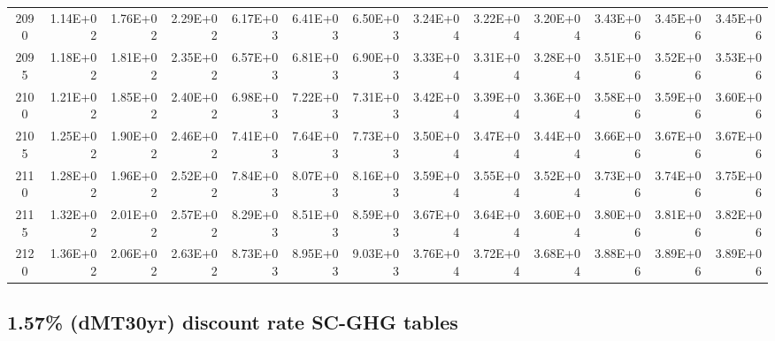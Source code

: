 \documentclass{article}
\begin{document}
\begin{table}
\begin{tabular}{crrr|rrr|rrr|rrr}
2090     & 1.14E+02 & 1.76E+02 & 2.29E+02 & 6.17E+03 & 6.41E+03 & 6.50E+03 & 3.24E+04 & 3.22E+04 & 3.20E+04 & 3.43E+06 & 3.45E+06 & 3.45E+06 \\
2095     & 1.18E+02 & 1.81E+02 & 2.35E+02 & 6.57E+03 & 6.81E+03 & 6.90E+03 & 3.33E+04 & 3.31E+04 & 3.28E+04 & 3.51E+06 & 3.52E+06 & 3.53E+06 \\
2100     & 1.21E+02 & 1.85E+02 & 2.40E+02 & 6.98E+03 & 7.22E+03 & 7.31E+03 & 3.42E+04 & 3.39E+04 & 3.36E+04 & 3.58E+06 & 3.59E+06 & 3.60E+06 \\
2105     & 1.25E+02 & 1.90E+02 & 2.46E+02 & 7.41E+03 & 7.64E+03 & 7.73E+03 & 3.50E+04 & 3.47E+04 & 3.44E+04 & 3.66E+06 & 3.67E+06 & 3.67E+06 \\
2110     & 1.28E+02 & 1.96E+02 & 2.52E+02 & 7.84E+03 & 8.07E+03 & 8.16E+03 & 3.59E+04 & 3.55E+04 & 3.52E+04 & 3.73E+06 & 3.74E+06 & 3.75E+06 \\
2115     & 1.32E+02 & 2.01E+02 & 2.57E+02 & 8.29E+03 & 8.51E+03 & 8.59E+03 & 3.67E+04 & 3.64E+04 & 3.60E+04 & 3.80E+06 & 3.81E+06 & 3.82E+06 \\
2120     & 1.36E+02 & 2.06E+02 & 2.63E+02 & 8.73E+03 & 8.95E+03 & 9.03E+03 & 3.76E+04 & 3.72E+04 & 3.68E+04 & 3.88E+06 & 3.89E+06 & 3.89E+06
\end{tabular}   \end{table}
\clearpage

\subsection{1.57\% (dMT30yr) discount rate SC-GHG tables}
\end{document}
